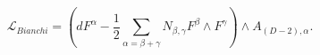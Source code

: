 \begin{equation}
\mathcal{L}_{Bianchi}=(dF^{\alpha }-\frac{1}{2}\sum\limits_{\alpha =\beta
+\gamma }N_{\beta ,\gamma }F^{\beta }\wedge F^{\gamma })\wedge A_{(
D-2),\alpha }.
\end{equation}

